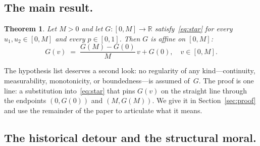 \documentclass{article}
\theoremstyle{plain}
\newtheorem{theorem}{Theorem}
\theoremstyle{definition}
\newcommand{\R}{\mathbb{R}}
\begin{document}
\subsection{The main result.}

\begin{theorem}\label{thm:main}
Let $M>0$ and let $G\colon[0,M]\to\R$ satisfy~\eqref{eq:star} for every
$u_1,u_2\in[0,M]$ and every $p\in[0,1]$. Then $G$ is affine on $[0,M]$:
\[
G(v) \;=\; \frac{G(M)-G(0)}{M}\,v + G(0), \quad v\in[0,M].
\]
\end{theorem}

The hypothesis list deserves a second look: no regularity of any
kind---continuity, measurability, monotonicity, or boundedness---is
assumed of~$G$. The proof is one line: a substitution into~\eqref{eq:star} that pins
$G(v)$ on the straight line through the endpoints $(0,G(0))$ and
$(M,G(M))$.
We give it in Section~\ref{sec:proof} and use the remainder of the paper
to articulate what it means.

\subsection{The historical detour and the structural moral.}
\label{ssec:detour}
\end{document}
